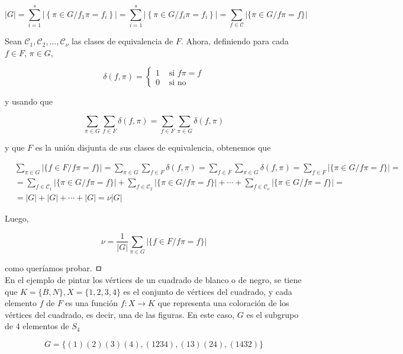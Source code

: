 \documentclass[10pt]{article}
\begin{document}
$$
|G|=\sum_{i=1}^{s}\left|\left\{\pi \in G / f_{1} \pi=f_{i}\right\}\right|=\sum_{i=1}^{s}\left|\left\{\pi \in G / f_{i} \pi=f_{i}\right\}\right|=\sum_{f \in \mathcal{C}}|\{\pi \in G / f \pi=f\}|
$$

Sean $\mathcal{C}_{1}, \mathcal{C}_{2}, \ldots, \mathcal{C}_{\nu}$ las clases de equivalencia de $F$. Ahora, definiendo para cada $f \in F$, $\pi \in G$,

$$
\delta(f, \pi)= \begin{cases}1 & \text { si } f \pi=f \\ 0 & \text { si no }\end{cases}
$$

y usando que

$$
\sum_{\pi \in G} \sum_{f \in F} \delta(f, \pi)=\sum_{f \in F} \sum_{\pi \in G} \delta(f, \pi)
$$

y que $F$ es la unión disjunta de sus clases de equivalencia, obtenemos que

$$
\begin{aligned}
& \sum_{\pi \in G}|\{f \in F / f \pi=f\}|=\sum_{\pi \in G} \sum_{f \in F} \delta(f, \pi)=\sum_{f \in F} \sum_{\pi \in G} \delta(f, \pi)=\sum_{f \in F}|\{\pi \in G / f \pi=f\}|= \\
& =\sum_{f \in \mathcal{C}_{1}}|\{\pi \in G / f \pi=f\}|+\sum_{f \in \mathcal{C}_{2}}|\{\pi \in G / f \pi=f\}|+\cdots+\sum_{f \in \mathcal{C}_{\nu}}|\{\pi \in G / f \pi=f\}|= \\
& =|G|+|G|+\cdots+|G|=\nu|G|
\end{aligned}
$$

Luego,

$$
\nu=\frac{1}{|G|} \sum_{\pi \in G}|\{f \in F / f \pi=f\}|
$$

como queríamos probar. ㅁ\\
En el ejemplo de pintar los vértices de un cuadrado de blanco o de negro, se tiene que $K=\{B, N\}, X=\{1,2,3,4\}$ es el conjunto de vértices del cuadrado, y cada elemento $f$ de $F$ es una función $f: X \longrightarrow K$ que representa una coloración de los vértices del cuadrado, es decir, una de las figuras. En este caso, $G$ es el subgrupo de 4 elementos de $S_{4}$

$$
G=\{(1)(2)(3)(4),(1234),(13)(24),(1432)\}
$$
\end{document}
